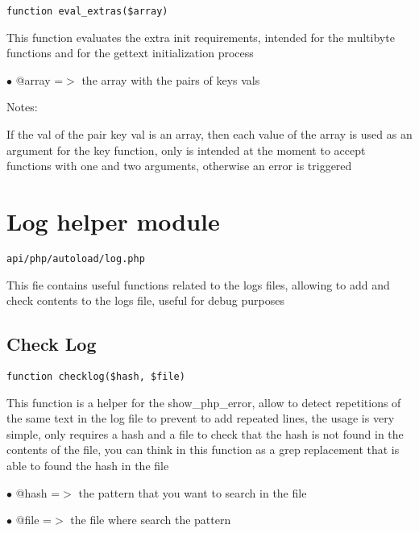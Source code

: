\documentclass[a4paper]{book}
\begin{document}
\begin{lstlisting}
function eval_extras($array)
\end{lstlisting}

This function evaluates the extra init requirements, intended for the multibyte
functions and for the gettext initialization process

\begin{compactitem}
\item[\color{myblue}$\bullet$] @array =$>$ the array with the pairs of keys vals
\end{compactitem}

Notes:

If the val of the pair key val is an array, then each value of the array is
used as an argument for the key function, only is intended at the moment to
accept functions with one and two arguments, otherwise an error is triggered

\hypertarget{toc192}{}
\section{Log helper module}

\begin{lstlisting}
api/php/autoload/log.php
\end{lstlisting}

This fie contains useful functions related to the logs files, allowing to add and check contents
to the logs file, useful for debug purposes

\hypertarget{toc193}{}
\subsection{Check Log}

\begin{lstlisting}
function checklog($hash, $file)
\end{lstlisting}

This function is a helper for the show\_php\_error, allow to detect repetitions
of the same text in the log file to prevent to add repeated lines, the usage
is very simple, only requires a hash and a file to check that the hash is not
found in the contents of the file, you can think in this function as a grep
replacement that is able to found the hash in the file

\begin{compactitem}
\item[\color{myblue}$\bullet$] @hash =$>$ the pattern that you want to search in the file
\item[\color{myblue}$\bullet$] @file =$>$ the file where search the pattern
\end{compactitem}
\end{document}
